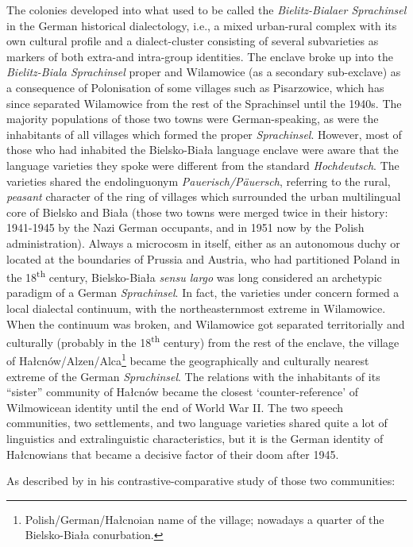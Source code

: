 \documentclass[output=paper]{langscibook}
\begin{document}
The colonies developed into what used to be called the \textit{Bielitz-Bialaer Sprachinsel} in the German historical dialectology, i.e., a mixed urban-rural complex with its own cultural profile and a dialect-cluster consisting of several subvarieties as markers of both extra-and intra-group identities. The enclave broke up into the \textit{Bielitz-Biala Sprachinsel} proper and Wilamowice (as a secondary sub-exclave) as a consequence of Polonisation of some villages such as Pisarzowice, which has since separated Wilamowice from the rest of the Sprachinsel until the 1940s. The majority populations of those two towns were German-speaking, as were the inhabitants of all villages which formed the proper \textit{Sprachinsel}. However, most of those who had inhabited the Bielsko-Biała language enclave were aware that the language varieties they spoke were different from the standard \textit{Hochdeutsch}. The varieties shared the endolinguonym \textit{Pauerisch/Päuersch}, referring to the rural, \textit{peasant} character of the ring of villages which surrounded the urban multilingual core of Bielsko and Biała (those two towns were merged twice in their history: 1941-1945 by the Nazi German occupants, and in 1951 now by the Polish administration). Always a microcosm in itself, either as an autonomous duchy or located at the boundaries of Prussia and Austria, who had partitioned Poland in the 18\textsuperscript{th} century, Bielsko-Biała \textit{sensu largo} was long considered an archetypic paradigm of a German \textit{Sprachinsel}. In fact, the varieties under concern formed a local dialectal continuum, with the northeasternmost extreme in Wilamowice. When the continuum was broken, and Wilamowice got separated territorially and culturally (probably in the 18\textsuperscript{th} century) from the rest of the enclave, the village of Hałcnów/Alzen/Alca\footnote{Polish/German/Hałcnoian name of the village; nowadays a quarter of the Bielsko-Biała conurbation.}
became the geographically and culturally nearest extreme of the German \textit{Sprachinsel}. The relations with the inhabitants of its “sister” community of Hałcnów became the closest ‘counter-reference’ of Wilmowicean identity until the end of World War II. The two speech communities, two settlements, and two language varieties shared quite a lot of linguistics and extralinguistic characteristics, but it is the German identity of Hałcnowians that became a decisive factor of their doom after 1945. 

As described by \citet[10]{metrak_wymysorys_2019} in his contrastive-comparative study of those two communities:
\end{document}
